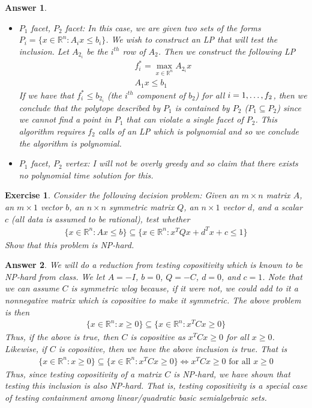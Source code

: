 \documentclass[12pt]{article}
\theoremstyle{colon}
\newtheorem{exercise}{Exercise}
\newtheorem*{answer}{Answer}
\begin{document}
\begin{answer}
\begin{itemize}
      \item $P_1$ facet, $P_2$ facet: In this case, we are given two sets of the forms $P_i = \{ x \in \mathbb{R}^n : A_i x \leq b_i\}$. We wish to construct an LP that will test the inclusion. Let $A_{2_i}$ be the $i^{th}$ row of $A_2$. Then we construct the following LP
        \begin{gather*}
          f_i^* = \max_{x \in \mathbb{R}^{n}} A_{2_i} x \\
          A_1 x \leq b_1
        \end{gather*}
        If we have that $f_i^* \leq b_{2_i}$ (the $i^{th}$ component of $b_2$) for all $i = 1, \mathellipsis, f_2$, then we conclude that the polytope described by $P_1$ is contained by $P_2$ ($P_1 \subseteq P_2$) since we cannot find a point in $P_1$ that can violate a single facet of $P_2$. This algorithm requires $f_2$ calls of an LP which is polynomial and so we conclude the algorithm is polynomial.

      \item $P_1$ facet, $P_2$ vertex: I will not be overly greedy and so claim that there exists no polynomial time solution for this.
  \end{itemize}
\end{answer}

\clearpage

\begin{exercise}
  Consider the following decision problem: Given an $m \times n$ matrix $A$, an $m \times 1$ vector $b$, an $n \times n$ symmetric matrix $Q$, an $n \times 1$ vector $d$, and a scalar $c$ (all data is assumed to be rational), test whether
  \begin{gather*}
    \{ x \in \mathbb{R}^n : Ax \leq b \} \subseteq \{ x \in \mathbb{R}^n : x^T Q x + d^T x + c \leq 1 \}
  \end{gather*}
  Show that this problem is NP-hard.
\end{exercise}

\begin{answer}
  We will do a reduction from testing copositivity which is known to be NP-hard from class. We let $A = -I$, $b = 0$, $Q = -C$, $d = 0$, and $c = 1$. Note that we can assume $C$ is symmetric wlog because, if it were not, we could add to it a nonnegative matrix which is copositive to make it symmetric. The above problem is then
  \begin{gather*}
    \{ x \in \mathbb{R}^n : x \geq 0 \} \subseteq \{ x \in \mathbb{R}^n : x^T C x \geq 0 \}
  \end{gather*}
  Thus, if the above is true, then $C$ is copositive as $x^T C x \geq 0$ for all $x \geq 0$. Likewise, if $C$ is copositive, then we have the above inclusion is true. That is
  \begin{gather*}
    \{ x \in \mathbb{R}^n : x \geq 0 \} \subseteq \{ x \in \mathbb{R}^n : x^T C x \geq 0 \} \Longleftrightarrow x^T C x \geq 0 \text{ for all } x \geq 0
  \end{gather*}
  Thus, since testing copositivity of a matrix $C$ is NP-hard, we have shown that testing this inclusion is also NP-hard. That is, testing copositivity is a special case of testing containment among linear/quadratic basic semialgebraic sets.
\end{answer}
\end{document}
